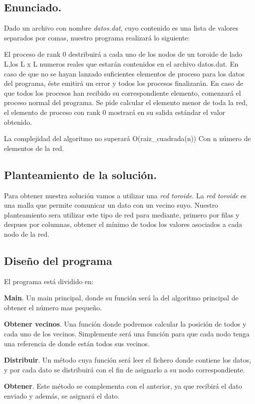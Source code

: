 \documentclass{article}
\begin{document}
\subsection{Enunciado.}
Dado un archivo con nombre \textit{datos.dat}, cuyo contenido es una lista de valores separados por comas, nuestro programa realizará lo siguiente:

El proceso de rank 0 destribuirá a cada uno de los nodos de un toroide de lado L,los L x L numeros reales que estarán contenidos en el archivo datos.dat.
En caso de que no se hayan lanzado suficientes elementos de proceso para los datos del programa, éste emitirá un error y todos los procesos finalizarán.
En caso de que todos los procesos han recibido su correspondiente elemento, comenzará el proceso normal del programa.
Se pide calcular el elemento menor de toda la red, el elemento de proceso con rank 0 mostrará en su salida estándar el valor obtenido.

La complejidad del algoritmo no superará O(raiz\_cuadrada(n)) Con n número de elementos de la red.

\subsection{Planteamiento de la solución.}

Para obtener nuestra solución vamos a utilizar una \textit{red toroide}. La \textit{red toroide} es una malla que permite comunicar un dato con un vecino suyo. Nuestro planteamiento sera utilizar este tipo de red para mediante, primero por filas y despues por columnas, obtener el mínimo de todos los valores asociados a cada nodo de la red.


\subsection{Diseño del programa}

El programa está dividido en: 
\begin{list}{•}{}
\item \textbf{Main}. Un main principal, donde su función será la del algoritmo principal de obtener el número mas pequeño.
\item \textbf{Obtener vecinos}. Una función donde podremos calcular la posición de todos y cada uno de los vecinos. Simplemente será una función para que cada nodo tenga una referencia de donde están todos sus vecinos.
\item \textbf{Distribuir}. Un método cuya función será leer el fichero donde contiene los datos, y por cada dato se distribuirá con el fin de asignarlo a su nodo correspondiente.
\item \textbf{Obtener}. Este método se complementa con el anterior, ya que recibirá el dato enviado y además, se asignará el dato.
\end{list}
\end{document}
